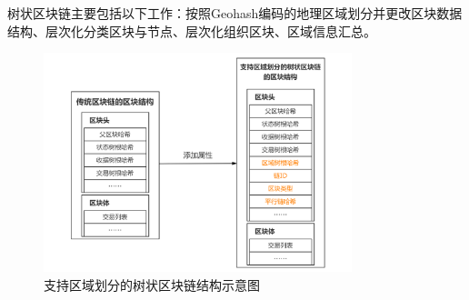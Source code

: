 树状区块链主要包括以下工作：按照Geohash编码的地理区域划分并更改区块数据结构、层次化分类区块与节点、层次化组织区块、区域信息汇总。

\begin{figure}[ht]
    \centering
    \includegraphics[width=0.8\textwidth]{undergraduate-thesis/images/TreeBlockchainNewProperty.png}
    \caption{支持区域划分的树状区块链结构示意图}
    \label{TreeBlockChain}
\end{figure}

